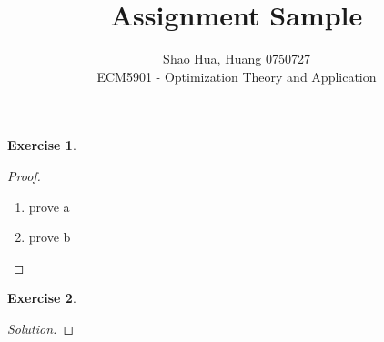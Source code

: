 \documentclass[12pt]{extarticle}
\title{Assignment Sample}
\author{Shao Hua, Huang 0750727\\
ECM5901 - Optimization Theory and Application}
\theoremstyle{definition}
\newtheorem{exercise}{Exercise}
\begin{document}
\maketitle

\begin{exercise}
  \blindtext
\end{exercise}
\begin{proof}
  $ $
  \begin{enumerate}[label=(\alph*)]
    \item prove a
    \item prove b\qedhere
  \end{enumerate}
\end{proof}

\begin{exercise}
  \blindtext
\end{exercise}
\begin{proof}[Solution]
  \let\qed\relax
  \blindmathtrue
  \blindmathpaper
\end{proof}
\end{document}
